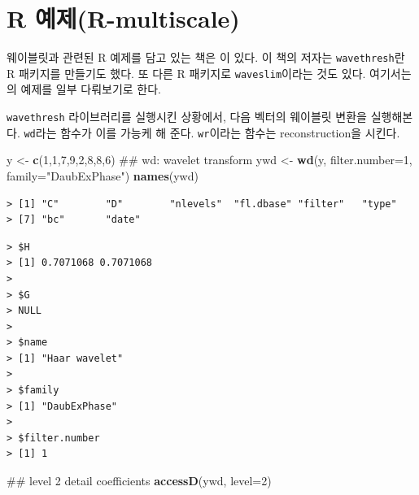 \documentclass[b5paper,]{scrbook}
\makeatletter
\newenvironment{Shaded}{\begin{snugshade}}{\end{snugshade}}
\newcommand{\KeywordTok}[1]{\textcolor[rgb]{0.13,0.29,0.53}{\textbf{#1}}}
\newcommand{\DataTypeTok}[1]{\textcolor[rgb]{0.13,0.29,0.53}{#1}}
\newcommand{\DecValTok}[1]{\textcolor[rgb]{0.00,0.00,0.81}{#1}}
\newcommand{\StringTok}[1]{\textcolor[rgb]{0.31,0.60,0.02}{#1}}
\newcommand{\OperatorTok}[1]{\textcolor[rgb]{0.81,0.36,0.00}{\textbf{#1}}}
\newcommand{\NormalTok}[1]{#1}
\theoremstyle{plain}
\theoremstyle{definition}
\numberwithin{equation}{section}
\newenvironment{kframe}{%
\medskip{}
\setlength{\fboxsep}{.8em}
 \def\at@end@of@kframe{}%
 \ifinner\ifhmode%
  \def\at@end@of@kframe{\end{minipage}}%
  \begin{minipage}{\columnwidth}%
 \fi\fi%
 \def\FrameCommand##1{\hskip\@totalleftmargin \hskip-\fboxsep
 \colorbox{shadecolor}{##1}\hskip-\fboxsep
     \hskip-\linewidth \hskip-\@totalleftmargin \hskip\columnwidth}%
 \MakeFramed {\advance\hsize-\width
   \@totalleftmargin\z@ \linewidth\hsize
   \@setminipage}}%
 {\par\unskip\endMakeFramed%
 \at@end@of@kframe}
\renewenvironment{Shaded}{\begin{kframe}}{\end{kframe}}
\makeatother
\begin{document}
\section{R 예제(R-multiscale)}\label{r-r-multiscale}

웨이블릿과 관련된 R 예제를 담고 있는 책은 \citep{Nason2010}이 있다. 이
책의 저자는 \texttt{wavethresh}란 R 패키지를 만들기도 했다. 또 다른 R
패키지로 \texttt{waveslim}이라는 것도 있다. 여기서는 \citep{Nason2010}의
예제를 일부 다뤄보기로 한다.

\texttt{wavethresh} 라이브러리를 실행시킨 상황에서, 다음 벡터의 웨이블릿
변환을 실행해본다. \texttt{wd}라는 함수가 이를 가능케 해 준다.
\texttt{wr}이라는 함수는 reconstruction을 시킨다.

\begin{Shaded}
\begin{Highlighting}[]
\NormalTok{y <-}\StringTok{ }\KeywordTok{c}\NormalTok{(}\DecValTok{1}\NormalTok{,}\DecValTok{1}\NormalTok{,}\DecValTok{7}\NormalTok{,}\DecValTok{9}\NormalTok{,}\DecValTok{2}\NormalTok{,}\DecValTok{8}\NormalTok{,}\DecValTok{8}\NormalTok{,}\DecValTok{6}\NormalTok{)}
\NormalTok{## wd: wavelet transform}
\NormalTok{ywd <-}\StringTok{ }\KeywordTok{wd}\NormalTok{(y, }\DataTypeTok{filter.number=}\DecValTok{1}\NormalTok{, }\DataTypeTok{family=}\StringTok{"DaubExPhase"}\NormalTok{)}
\KeywordTok{names}\NormalTok{(ywd)}
\end{Highlighting}
\end{Shaded}

\begin{verbatim}
> [1] "C"        "D"        "nlevels"  "fl.dbase" "filter"   "type"    
> [7] "bc"       "date"
\end{verbatim}

\begin{Shaded}
\end{Shaded}

\begin{verbatim}
> $H
> [1] 0.7071068 0.7071068
> 
> $G
> NULL
> 
> $name
> [1] "Haar wavelet"
> 
> $family
> [1] "DaubExPhase"
> 
> $filter.number
> [1] 1
\end{verbatim}

\begin{Shaded}
\begin{Highlighting}[]
\NormalTok{## level 2 detail coefficients}
\KeywordTok{accessD}\NormalTok{(ywd, }\DataTypeTok{level=}\DecValTok{2}\NormalTok{)}
\end{Highlighting}
\end{Shaded}
\end{document}
